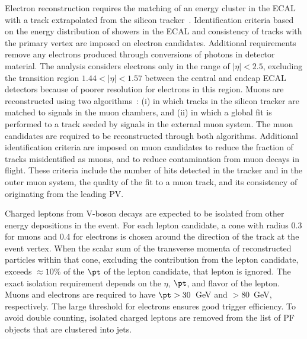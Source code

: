 Electron reconstruction requires the matching of an energy cluster in the 
ECAL with a track extrapolated from the silicon 
tracker~\cite{CMS-PAS-EGM-10-004}.  
Identification criteria based on the energy distribution of showers in the 
ECAL %
and consistency of tracks 
with the primary vertex are imposed on electron candidates. 
Additional requirements remove any electrons produced through
conversions of photons in detector material. 
The analysis considers electrons only in the range of $|\eta|<2.5$, 
excluding the transition region $1.44<|\eta|<1.57$ between the central and endcap ECAL detectors 
because of poorer resolution for electrons in this region.
Muons are reconstructed using two algorithms~\cite{CMS-PAS-MUO-10-004}: 
(i) in which tracks in the silicon tracker are matched to signals in 
the muon chambers, and (ii) in which a global fit is performed to a track 
seeded by signals in the external muon system. 
The muon candidates are required to be reconstructed through both algorithms. 
Additional identification criteria are imposed on muon candidates to reduce 
the fraction of tracks misidentified as muons, and to reduce
contamination from muon 
decays in flight. 
These criteria include the number of hits detected 
in the tracker and in the outer muon system, the quality of the fit to 
a muon track, and its consistency of originating from the leading PV.



Charged leptons from V-boson decays are expected to be isolated from 
other energy depositions in the event. 
For each lepton candidate, a cone with radius 0.3 for muons and 0.4
for electrons is chosen around the direction of the 
track at the event vertex. 
When the scalar sum of the transverse momenta of reconstructed particles
within that cone, excluding the contribution from the 
lepton candidate, 
exceeds ${\approx} 10\%$ of the $\pt$ of the 
lepton candidate, that lepton is ignored.  
The exact isolation requirement depends on the $\eta$, $\pt$, and flavor of
the lepton.  
Muons and electrons are required to have $\pt > 30$~GeV and $>80$~GeV, respectively. 
The large threshold for electrons ensures good trigger efficiency.
To avoid double counting, isolated charged leptons are removed from 
the list of PF objects that are clustered into jets.



